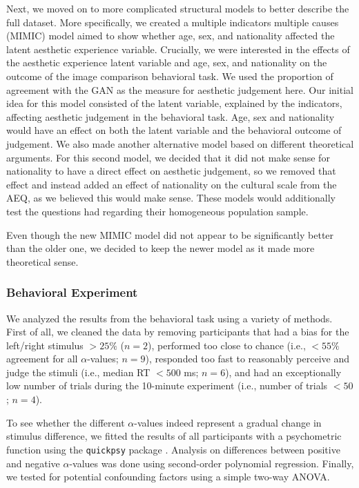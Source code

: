 \documentclass[../main.tex]{subfiles}
\begin{document}
	Next, we moved on to more complicated structural models to better describe the full dataset. More specifically, we created a multiple indicators multiple causes (MIMIC) model aimed to show whether age, sex, and nationality affected the latent aesthetic experience variable. Crucially, we were interested in the effects of the aesthetic experience latent variable and age, sex, and nationality on the outcome of the image comparison behavioral task. We used the proportion of agreement with the GAN as the measure for aesthetic judgement here. Our initial idea for this model consisted of the latent variable, explained by the indicators, affecting aesthetic judgement in the behavioral task. Age, sex and nationality would have an effect on both the latent variable and the behavioral outcome of judgement. We also made another alternative model based on different theoretical arguments. For this second model, we decided that it did not make sense for nationality to have a direct effect on aesthetic judgement, so we removed that effect and instead added an effect of nationality on the cultural scale from the AEQ, as we believed this would make sense. These models would additionally test the questions \textcite{wanzerExperiencingFlowViewing2020} had regarding their homogeneous population sample. 
	
	Even though the new MIMIC model did not appear to be significantly better than the older one, we decided to keep the newer model as it made more theoretical sense.
	
	
	
	\subsubsection{Behavioral Experiment}
	We analyzed the results from the behavioral task using a variety of methods. First of all, we cleaned the data by removing participants that had a bias for the left/right stimulus $>25\%$ ($n=2$), performed too close to chance (i.e., $<55\%$ agreement for all $\alpha$-values; $n=9$), responded too fast to reasonably perceive and judge the stimuli (i.e., median RT $<500$ ms; $n=6$), and had an exceptionally low number of trials during the 10-minute experiment (i.e., number of trials $<50$; $n=4$).
	
	To see whether the different $\alpha$-values indeed represent a gradual change in stimulus difference, we fitted the results of all participants with a psychometric function using the \texttt{quickpsy} package \parencite{linares2016quickpsy}. Analysis on differences between positive and negative $\alpha$-values was done using second-order polynomial regression. Finally, we tested for potential confounding factors using a simple two-way ANOVA.
	
\end{document}
